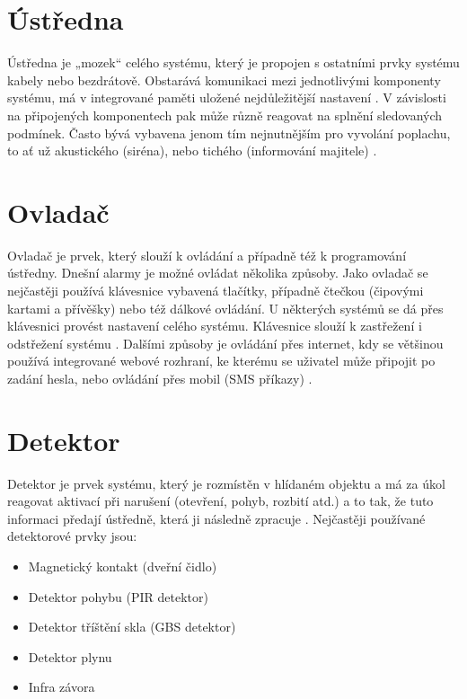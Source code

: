 \documentclass[FM,MP]{tulthesis}  %
\begin{document}
\section{Ústředna}
Ústředna je „mozek“ celého systému, který je propojen s ostatními prvky systému kabely nebo bezdrátově. Obstarává komunikaci mezi jednotlivými komponenty systému, má v integrované paměti uložené nejdůležitější nastavení \cite{Electronic security system}. V závislosti na připojených komponentech pak může různě reagovat na splnění sledovaných podmínek. Často bývá vybavena jenom tím nejnutnějším pro vyvolání poplachu, to ať už akustického (siréna), nebo tichého (informování majitele) \cite{Security alarm}.

\section{Ovladač}
Ovladač je prvek, který slouží k ovládání a případně též k programování ústředny. Dnešní alarmy je možné ovládat několika způsoby. Jako ovladač se nejčastěji používá klávesnice vybavená tlačítky, případně čtečkou (čipovými kartami a přívěšky) nebo též dálkové ovládání. U některých systémů se dá přes klávesnici provést nastavení celého systému. Klávesnice slouží k zastřežení i odstřežení systému \cite{Electronic security signalisation}. Dalšími způsoby je ovládání přes internet, kdy se většinou používá integrované webové rozhraní, ke kterému se uživatel může připojit po zadání hesla, nebo ovládání přes mobil (SMS příkazy) \cite{Bachelor thesis}.

\section{Detektor}
Detektor je prvek systému, který je rozmístěn v hlídaném objektu a má za úkol reagovat aktivací při narušení (otevření, pohyb, rozbití atd.) a to tak, že tuto informaci předají ústředně, která ji následně zpracuje \cite{Electronic security signalisation}. Nejčastěji používané detektorové prvky jsou:

\begin{itemize}
\item Magnetický kontakt (dveřní čidlo)
\item Detektor pohybu (PIR detektor)
\item Detektor tříštění skla (GBS detektor)
\item Detektor plynu
\item Infra závora
\end{itemize} 
\end{document}
